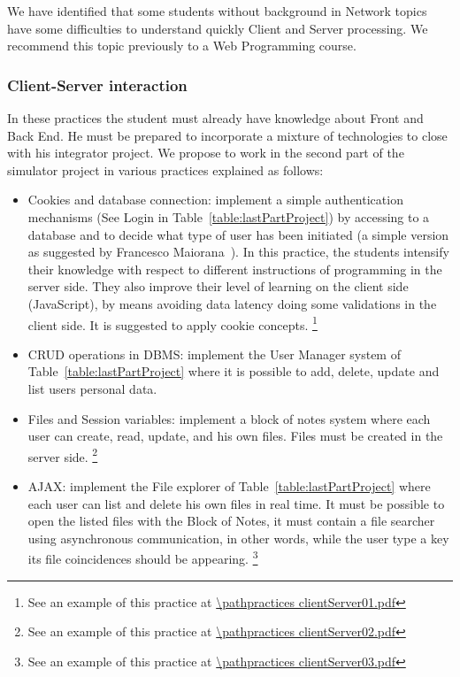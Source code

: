 We have identified that some students without background in Network topics
have some difficulties to understand quickly Client and Server processing.
We recommend this topic previously to a Web Programming course.

\subsubsection{Client-Server interaction}
In these practices the student must already have knowledge about Front and Back End. 
He must be prepared to incorporate a mixture of technologies to close with his integrator 
project. We propose to work in the second part of the simulator project in various practices
explained as follows:
\begin{itemize}
    \item Cookies and database connection: implement a simple authentication mechanisms 
        (See Login in Table~\ref{table:lastPartProject}) by 
        accessing to a database and to decide what type of user has been initiated (a simple 
        version as suggested by Francesco Maiorana~\cite{Maiorana14}). In this practice, the 
        students intensify their knowledge with respect to different instructions of programming 
        in the server side. They also improve their level of learning on the client side 
        (JavaScript), by means avoiding data latency doing some validations in the client 
        side. It is suggested to apply cookie concepts.
        \footnote{See an example of this practice at \url{\pathpractices clientServer01.pdf}}
    \item CRUD operations in DBMS: implement the User Manager system of  
        Table~\ref{table:lastPartProject} where it is possible to 
        add, delete, update and list users personal data.
    \item Files and Session variables: implement a block of notes system where each user
        can create, read, update, and his own files. Files must be created in the server
        side.
        \footnote{See an example of this practice at \url{\pathpractices clientServer02.pdf}}
    \item AJAX: implement the File explorer of  
        Table~\ref{table:lastPartProject}
        where each user can list and delete his own files in real time. It must be possible to open the listed
        files with the Block of Notes, it must contain a file searcher using asynchronous communication, 
        in other words, while the user type a key its file coincidences should be appearing.
        \footnote{See an example of this practice at \url{\pathpractices clientServer03.pdf}}
\end{itemize}


